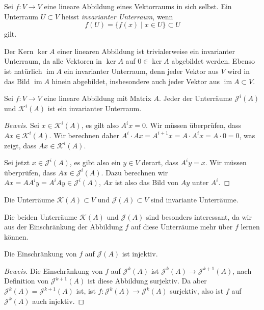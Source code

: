 \begin{definition}
\label{buch:eigenwerte:def:invarianter-unterraum}
Sei $f\colon V\to V$ eine lineare Abbildung eines Vektorraums in sich
selbst.
Ein Unterraum $U\subset V$ heisst {\em invarianter Unterraum},
wenn
\[
f(U) = \{ f(x)\;|\; x\in U\} \subset U
\]
gilt.
%
%
\end{definition}

Der Kern $\ker A$ einer linearen Abbildung ist trivialerweise ein
invarianter Unterraum, da alle Vektoren in $\ker A$ auf $0\in\ker A$
abgebildet werden.
Ebenso ist natürlich $\operatorname{im}A$ ein invarianter Unterraum,
denn jeder Vektor aus $V$ wird in das Bild $\operatorname{im}A$ hinein
abgebildet, insbesondere auch jeder Vektor aus $\operatorname{im}A\subset V$.

\begin{satz}
\label{buch:eigenwerte:satz:KJinvariant}
Sei $f\colon V\to V$ eine lineare Abbildung mit Matrix $A$.
Jeder der Unterräume $\mathcal{J}^i(A)$ und $\mathcal{K}^i(A)$ 
ist ein invarianter Unterraum.
\end{satz}

\begin{proof}[Beweis]
Sei $x\in\mathcal{K}^i(A)$, es gilt also $A^ix=0$.
Wir müssen überprüfen, dass $Ax\in\mathcal{K}^i(A)$.
Wir berechnen daher $A^i\cdot Ax=A^{i+1}x=A\cdot A^ix = A\cdot 0=0$,
was zeigt, dass $Ax\in\mathcal{K}^i(A)$.

Sei jetzt $x\in\mathcal{J}^i(A)$, es gibt also ein $y\in V$ derart, dass
$A^iy=x$.
Wir müssen überprüfen, dass $Ax\in\mathcal{J}^i(A)$.
Dazu berechnen wir $Ax=AA^iy=A^iAy\in\mathcal{J}^i(A)$, $Ax$ ist also das
Bild von $Ay$ unter $A^i$.
\end{proof}

\begin{korollar}
Die Unterräume $\mathcal{K}(A)\subset V$ und $\mathcal{J}(A)\subset V$
sind invariante Unterräume.
\end{korollar}

Die beiden Unterräume $\mathcal{K}(A)$ und $\mathcal{J}(A)$ sind besonders
interessant, da wir aus der Einschränkung der Abbildung $f$ auf diese
Unterräume mehr über $f$ lernen können.

\begin{satz}
\label{buch:eigenwerte:satz:fJinj}
Die Einschränkung von $f$ auf $\mathcal{J}(A)$ ist injektiv.
\end{satz}

\begin{proof}[Beweis]
Die Einschränkung von $f$ auf $\mathcal{J}^k(A)$ ist
$\mathcal{J}^k(A) \to \mathcal{J}^{k+1}(A)$, nach Definition von
$\mathcal{J}^{k+1}(A)$ ist diese Abbildung surjektiv.
Da aber $\mathcal{J}^k(A)=\mathcal{J}^{k+1}(A)$ ist, ist
$f\colon \mathcal{J}^k(A)\to\mathcal{J}^k(A)$ surjektiv,
also ist $f$ auf $\mathcal{J}^k(A)$ auch injektiv.
\end{proof}

